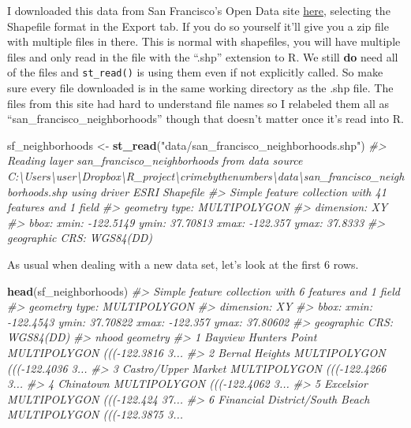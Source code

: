 \documentclass[
  12pt,
]{book}
\newenvironment{Shaded}{\begin{snugshade}}{\end{snugshade}}
\newcommand{\CommentTok}[1]{\textcolor[rgb]{0.37,0.37,0.37}{\textit{#1}}}
\newcommand{\KeywordTok}[1]{\textcolor[rgb]{0.27,0.27,0.27}{\textbf{#1}}}
\newcommand{\NormalTok}[1]{#1}
\newcommand{\StringTok}[1]{\textcolor[rgb]{0.5,0.5,0.5}{#1}}
\begin{document}
I downloaded this data from San Francisco's Open Data site \href{https://data.sfgov.org/Geographic-Locations-and-Boundaries/Analysis-Neighborhoods/p5b7-5n3h}{here}, selecting the Shapefile format in the Export tab. If you do so yourself it'll give you a zip file with multiple files in there. This is normal with shapefiles, you will have multiple files and only read in the file with the ``.shp'' extension to R. We still \textbf{do} need all of the files and \texttt{st\_read()} is using them even if not explicitly called. So make sure every file downloaded is in the same working directory as the .shp file. The files from this site had hard to understand file names so I relabeled them all as ``san\_francisco\_neighborhoods'' though that doesn't matter once it's read into R.

\begin{Shaded}
\begin{Highlighting}[]
\NormalTok{sf\_neighborhoods <{-}}\StringTok{ }\KeywordTok{st\_read}\NormalTok{(}\StringTok{"data/san\_francisco\_neighborhoods.shp"}\NormalTok{)}
\CommentTok{\#> Reading layer \textasciigrave{}san\_francisco\_neighborhoods\textquotesingle{} from data source \textasciigrave{}C:\textbackslash{}Users\textbackslash{}user\textbackslash{}Dropbox\textbackslash{}R\_project\textbackslash{}crimebythenumbers\textbackslash{}data\textbackslash{}san\_francisco\_neighborhoods.shp\textquotesingle{} using driver \textasciigrave{}ESRI Shapefile\textquotesingle{}}
\CommentTok{\#> Simple feature collection with 41 features and 1 field}
\CommentTok{\#> geometry type:  MULTIPOLYGON}
\CommentTok{\#> dimension:      XY}
\CommentTok{\#> bbox:           xmin: {-}122.5149 ymin: 37.70813 xmax: {-}122.357 ymax: 37.8333}
\CommentTok{\#> geographic CRS: WGS84(DD)}
\end{Highlighting}
\end{Shaded}

As usual when dealing with a new data set, let's look at the first 6 rows.

\begin{Shaded}
\begin{Highlighting}[]
\KeywordTok{head}\NormalTok{(sf\_neighborhoods)}
\CommentTok{\#> Simple feature collection with 6 features and 1 field}
\CommentTok{\#> geometry type:  MULTIPOLYGON}
\CommentTok{\#> dimension:      XY}
\CommentTok{\#> bbox:           xmin: {-}122.4543 ymin: 37.70822 xmax: {-}122.357 ymax: 37.80602}
\CommentTok{\#> geographic CRS: WGS84(DD)}
\CommentTok{\#>                            nhood                       geometry}
\CommentTok{\#> 1          Bayview Hunters Point MULTIPOLYGON ((({-}122.3816 3...}
\CommentTok{\#> 2                 Bernal Heights MULTIPOLYGON ((({-}122.4036 3...}
\CommentTok{\#> 3            Castro/Upper Market MULTIPOLYGON ((({-}122.4266 3...}
\CommentTok{\#> 4                      Chinatown MULTIPOLYGON ((({-}122.4062 3...}
\CommentTok{\#> 5                      Excelsior MULTIPOLYGON ((({-}122.424 37...}
\CommentTok{\#> 6 Financial District/South Beach MULTIPOLYGON ((({-}122.3875 3...}
\end{Highlighting}
\end{Shaded}
\end{document}
